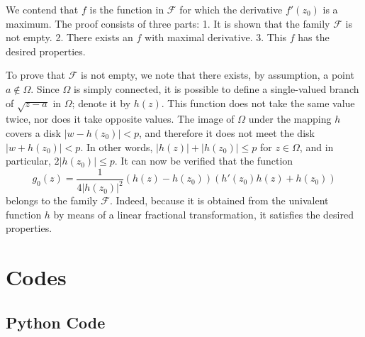 \documentclass[
]{book}
\theoremstyle{definition}
\theoremstyle{definition}
\theoremstyle{definition}
\theoremstyle{definition}
\theoremstyle{remark}
\begin{document}
We contend that \(f\) is the function in \(\mathcal{F}\) for which the derivative \(f'(z_0)\) is a maximum. The proof consists of three parts:
1. It is shown that the family \(\mathcal{F}\) is not empty.
2. There exists an \(f\) with maximal derivative.
3. This \(f\) has the desired properties.

To prove that \(\mathcal{F}\) is not empty, we note that there exists, by assumption, a point \(a \notin \Omega\). Since \(\Omega\) is simply connected, it is possible to define a single-valued branch of \(\sqrt{z - a}\) in \(\Omega\); denote it by \(h(z)\). This function does not take the same value twice, nor does it take opposite values. The image of \(\Omega\) under the mapping \(h\) covers a disk \(|w - h(z_0)| < p\), and therefore it does not meet the disk \(|w + h(z_0)| < p\). In other words, \(|h(z)| + |h(z_0)| \leq p\) for \(z \in \Omega\), and in particular, \(2|h(z_0)| \leq p\). It can now be verified that the function
\[ g_0(z) = \frac{1}{4|h(z_0)|^2} \left(h(z) - h(z_0)\right) \left(h'(z_0) h(z) + h(z_0)\right) \]
belongs to the family \(\mathcal{F}\). Indeed, because it is obtained from the univalent function \(h\) by means of a linear fractional transformation, it satisfies the desired properties.

\chapter{Codes}\label{codes}

\section{Python Code}\label{python-code}
\end{document}
